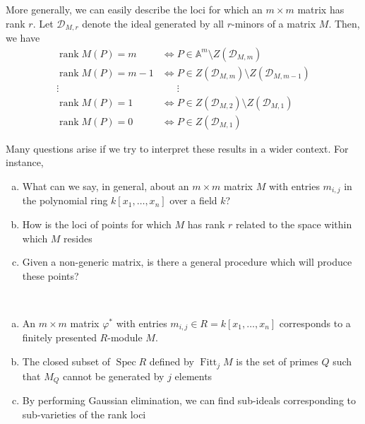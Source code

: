 \documentclass{amsart}
\theoremstyle{definition}
\theoremstyle{remark}
\DeclareMathOperator{\rank}{rank}
\DeclareMathOperator{\Spec}{Spec}
\DeclareMathOperator{\Fitt}{Fitt}
\numberwithin{equation}{section}
\begin{document}
More generally, we can easily describe the loci for which an $m \times m$ matrix has rank $r$. Let $\mathcal{D}_{M,r}$ denote the ideal generated by all $r$-minors of a matrix $M$. Then, we have
\begin{align*}
  \rank M(P) = m &\iff P \in \mathbb{A}^m \setminus Z(\mathcal{D}_{M,m})\\
  \rank M(P) = m-1 &\iff P \in Z(\mathcal{D}_{M,m}) \setminus Z(\mathcal{D}_{M,m-1})\\
  \vdots &\phantom{\iff} \vdots\\
  \rank M(P) = 1 &\iff P \in Z(\mathcal{D}_{M,2}) \setminus Z(\mathcal{D}_{M,1})\\
  \rank M(P) = 0 &\iff P \in Z(\mathcal{D}_{M,1})
\end{align*}

Many questions arise if we try to interpret these results in a wider context. For instance,
\begin{enumerate}[(a)]
  \item What can we say, in general, about an $m \times m$ matrix $M$ with entries $m_{i,j}$ in the polynomial ring $k[x_1, \ldots, x_n]$ over a field $k$?
  \item How is the loci of points for which $M$ has rank $r$ related to the space within which $M$ resides
  \item Given a non-generic matrix, is there a general procedure which will produce these points?
\end{enumerate}
\begin{aroundtodo}[prepend, caption={Summary of Questions}]
  \leavevmode \\
  \begin{enumerate}[(a)]
    \item An $m \times m$ matrix $\varphi^{*}$ with entries $m_{i,j} \in R = k[x_1, \dots, x_n]$ corresponds to a finitely presented $R$-module $M$.
    \item The closed subset of $\Spec R$ defined by $\Fitt_j M$ is the set of primes $Q$ such that $M_Q$ cannot be generated by $j$ elements
    \item By performing Gaussian elimination, we can find sub-ideals corresponding to sub-varieties of the rank loci
  \end{enumerate}
\end{aroundtodo}

\end{document}
